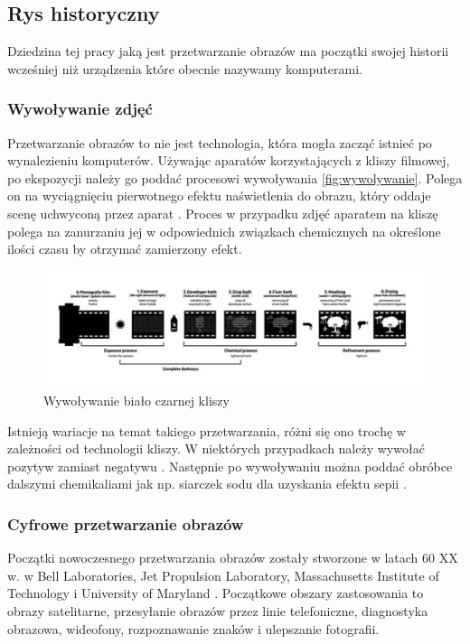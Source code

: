 \subsection{Rys historyczny}

Dziedzina tej pracy jaką jest przetwarzanie obrazów ma początki swojej historii wcześniej niż urządzenia które obecnie nazywamy komputerami.

\subsubsection{Wywoływanie zdjęć}
Przetwarzanie obrazów to nie jest technologia, która mogła zacząć istnieć po wynalezieniu komputerów. Używając aparatów korzystających z kliszy filmowej, po ekspozycji należy go poddać procesowi wywoływania \autoref{fig:wywolywanie}. 
Polega on na wyciągnięciu pierwotnego efektu naświetlenia do obrazu, który oddaje scenę uchwyconą przez aparat \cite{doi:https://doi.org/10.1002/14356007.a20_001}. Proces w przypadku zdjęć aparatem na kliszę polega na zanurzaniu jej w odpowiednich związkach chemicznych na określone ilości czasu by otrzymać zamierzony efekt. 

\begin{figure}[H]
    \centering
    \includegraphics{./images/Picture1.jpg}
    \caption{Wywoływanie biało czarnej kliszy}
    \label{fig:wywolywanie}
\end{figure}


Istnieją wariacje na temat takiego przetwarzania, różni się ono trochę w zależności od technologii kliszy. W niektórych przypadkach należy wywołać pozytyw zamiast negatywu \cite{almanac}. 
Następnie po wywoływaniu można poddać obróbce dalszymi chemikaliami jak np. siarczek sodu dla uzyskania efektu sepii \cite{sepia}. 

\subsubsection{Cyfrowe przetwarzanie obrazów}
Początki nowoczesnego przetwarzania obrazów zostały stworzone w latach 60 XX w. w Bell Laboratories, Jet Propulsion Laboratory, Massachusetts Institute of Technology i University of Maryland \cite{computerProcessing}. 
Początkowe obszary zastosowania to obrazy satelitarne, przesyłanie obrazów przez linie telefoniczne, diagnostyka obrazowa, wideofony, rozpoznawanie znaków i ulepszanie fotografii. 

